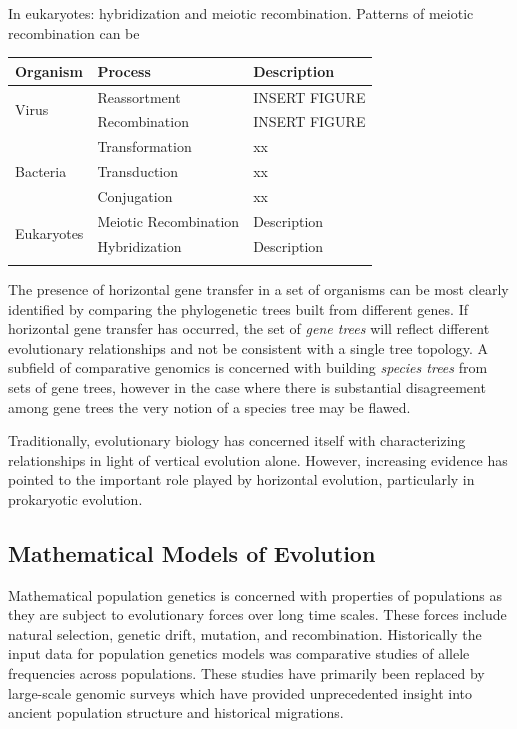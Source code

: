 In eukaryotes: hybridization and meiotic recombination.
Patterns of meiotic recombination can be 

\begin{tabularx}{\textwidth}{lll}
\toprule
Organism & Process & Description \\
\midrule
\multirow{2}{*}{Virus} & Reassortment & INSERT FIGURE \\
                       & Recombination & INSERT FIGURE \\
\midrule
\multirow{3}{*}{Bacteria} & Transformation & xx \\
                          & Transduction   & xx \\
                          & Conjugation    & xx \\
\midrule
\multirow{2}{*}{Eukaryotes} & Meiotic Recombination & Description \\
                            & Hybridization         & Description \\
\bottomrule
\label{table:reticulation_processes}
\end{tabularx}

The presence of horizontal gene transfer in a set of organisms can be most clearly identified by comparing the phylogenetic trees built from different genes.
If horizontal gene transfer has occurred, the set of \emph{gene trees} will reflect different evolutionary relationships and not be consistent with a single tree topology.
A subfield of comparative genomics is concerned with building \emph{species trees} from sets of gene trees, however in the case where there is substantial disagreement among gene trees the very notion of a species tree may be flawed.

Traditionally, evolutionary biology has concerned itself with characterizing relationships in light of vertical evolution alone.
However, increasing evidence  has pointed to the important role played by horizontal evolution, particularly in prokaryotic evolution.

\subsection{Mathematical Models of Evolution}

Mathematical population genetics is concerned with properties of populations as they are subject to evolutionary forces over long time scales.
These forces include natural selection, genetic drift, mutation, and recombination.
Historically the input data for population genetics models was comparative studies of allele frequencies across populations.
These studies have primarily been replaced by large-scale genomic surveys which have provided unprecedented insight into ancient population structure and historical migrations.

